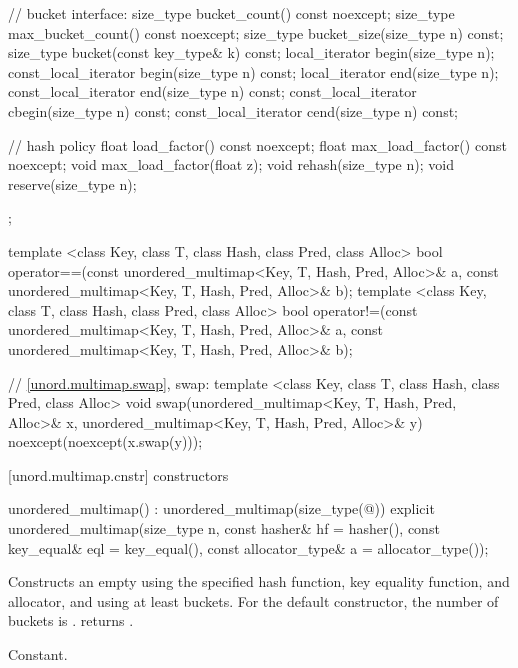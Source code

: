 \begin{codeblock}
{{    // bucket interface:
    size_type bucket_count() const noexcept;
    size_type max_bucket_count() const noexcept;
    size_type bucket_size(size_type n) const;
    size_type bucket(const key_type& k) const;
    local_iterator begin(size_type n);
    const_local_iterator begin(size_type n) const;
    local_iterator end(size_type n);
    const_local_iterator end(size_type n) const;
    const_local_iterator cbegin(size_type n) const;
    const_local_iterator cend(size_type n) const;

    // hash policy
    float load_factor() const noexcept;
    float max_load_factor() const noexcept;
    void max_load_factor(float z);
    void rehash(size_type n);
    void reserve(size_type n);
  };

  template <class Key, class T, class Hash, class Pred, class Alloc>
    bool operator==(const unordered_multimap<Key, T, Hash, Pred, Alloc>& a,
                    const unordered_multimap<Key, T, Hash, Pred, Alloc>& b);
  template <class Key, class T, class Hash, class Pred, class Alloc>
    bool operator!=(const unordered_multimap<Key, T, Hash, Pred, Alloc>& a,
                    const unordered_multimap<Key, T, Hash, Pred, Alloc>& b);

  // \ref{unord.multimap.swap}, swap:
  template <class Key, class T, class Hash, class Pred, class Alloc>
    void swap(unordered_multimap<Key, T, Hash, Pred, Alloc>& x,
              unordered_multimap<Key, T, Hash, Pred, Alloc>& y)
      noexcept(noexcept(x.swap(y)));

}
\end{codeblock}

[unord.multimap.cnstr]{ constructors}

%
\begin{itemdecl}
unordered_multimap() : unordered_multimap(size_type(@\seebelow@)) { }
explicit unordered_multimap(size_type n,
                            const hasher& hf = hasher(),
                            const key_equal& eql = key_equal(),
                            const allocator_type& a = allocator_type());
\end{itemdecl}

\begin{itemdescr}
\pnum
\effects Constructs an empty  using the
specified hash function, key equality function, and allocator, and
using at least  buckets.  For the default constructor,
the number of buckets is .
 returns .

\pnum
\complexity Constant.
\end{itemdescr}

